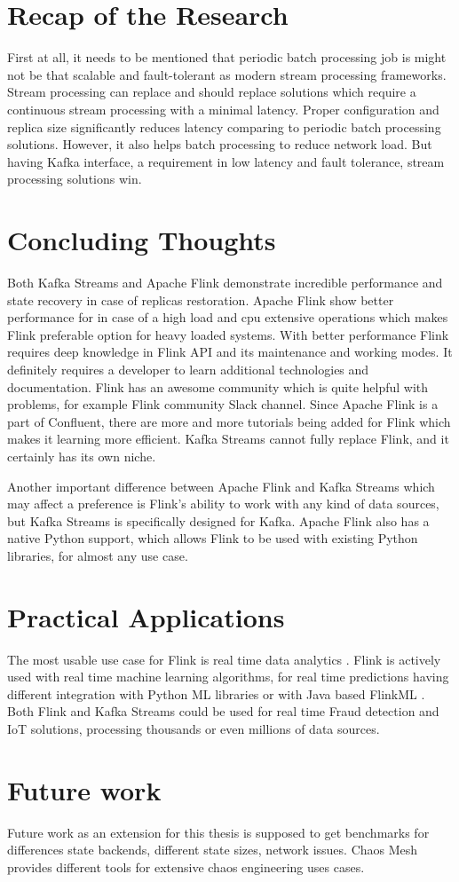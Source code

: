 \section{Recap of the Research}\label{sec:recap-of-the-research}
First at all, it needs to be mentioned that periodic batch processing job
is might not be that scalable and fault-tolerant as modern
stream processing frameworks.
Stream processing can replace and should replace solutions which require
a continuous stream processing with a minimal latency.
Proper configuration and replica size significantly reduces latency comparing
to periodic batch processing solutions.
However, it also helps batch processing to reduce network load.
But having Kafka interface, a requirement in low latency and fault tolerance,
stream processing solutions win.

\section{Concluding Thoughts}\label{sec:concluding-thoughts}
Both Kafka Streams and Apache Flink demonstrate incredible performance
and state recovery in case of replicas restoration.
Apache Flink show better performance for in case of a high load
and cpu extensive operations which makes Flink preferable
option for heavy loaded systems.
With better performance Flink requires deep knowledge in Flink
API and its maintenance and working modes.
It definitely requires a developer to learn additional technologies and documentation.
Flink has an awesome community which is quite helpful with problems,
for example Flink community Slack channel.
Since Apache Flink is a part of Confluent, there are more and more tutorials
being added for Flink which makes it learning more efficient.
Kafka Streams cannot fully replace Flink, and it certainly has its own niche.

Another important difference between Apache Flink and Kafka Streams which
may affect a preference is Flink's ability to work with any kind of data
sources, but Kafka Streams is specifically designed for Kafka.
Apache Flink also has a native Python support, which allows Flink
to be used with existing Python libraries, for almost any use case.

\section{Practical Applications}\label{sec:practical-applications}
The most usable use case for Flink is real time data analytics \cite{flink_use_cases}.
Flink is actively used with real time machine learning algorithms, for
real time predictions having different integration with Python ML libraries
or with Java based FlinkML \cite{flink_ml}.
Both Flink and Kafka Streams could be used for real time Fraud detection
and IoT solutions, processing thousands or even millions of data sources.


\section{Future work}\label{sec:future-work}
Future work as an extension for this thesis is supposed to get benchmarks
for differences state backends, different state sizes, network issues.
Chaos Mesh \cite{chaosMesh} provides different tools for extensive chaos engineering
uses cases.